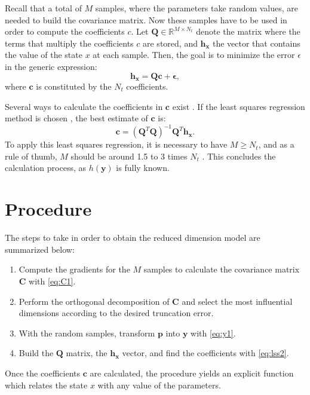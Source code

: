 Recall that a total of $M$ samples, where the parameters take random values, are needed to build the covariance matrix. Now these samples have to be used in order to compute the coefficients $c$. Let $\mathbf{Q} \in \mathbb{R}^{M \times N_t}$ denote the matrix where the terms that multiply the coefficients $c$ are stored, and $\mathbf{h_x}$ the vector that contains the value of the state $x$ at each sample. Then, the goal is to minimize the error $\epsilon$ in the generic expression:
\begin{equation}
  \mathbf{h_x} = \mathbf{Q} \mathbf{c} + \mathbf{\epsilon},
  \label{eq:lss}
\end{equation}
where $\mathbf{c}$ is constituted by the $N_t$ coefficients. 

Several ways to calculate the coefficients in $\mathbf{c}$ exist \cite{shen2020}. If the least squares regression method is chosen \cite{shin2016}, the best estimate of $\mathbf{c}$ is: 
\begin{equation}
  \mathbf{c} = \left(\mathbf{Q}^T \mathbf{Q}\right)^{-1} \mathbf{Q}^T \mathbf{h_x}.
  \label{eq:lss2}
\end{equation}
To apply this least squares regression, it is necessary to have $M \geq N_t$, and as a rule of thumb, $M$ should be around 1.5 to 3 times $N_t$ \cite{shin2016}. This concludes the calculation process, as $h(\mathbf{y})$ is fully known. 


\section{Procedure}
The steps to take in order to obtain the reduced dimension model are summarized below:
\begin{enumerate}
  \item Compute the gradients for the $M$ samples to calculate the covariance matrix $\mathbf{C}$ with \eqref{eq:C1}. 
  \item Perform the orthogonal decomposition of $\mathbf{C}$ and select the most influential dimensions according to the desired truncation error. 
  \item With the random samples, transform $\mathbf{p}$ into $\mathbf{y}$ with \eqref{eq:y1}. 
  \item Build the $\mathbf{Q}$ matrix, the $\mathbf{h_x}$ vector, and find the coefficients with \eqref{eq:lss2}. 
\end{enumerate}
Once the coefficients $\mathbf{c}$ are calculated, the procedure yields an explicit function which relates the state $x$ with any value of the parameters. 

